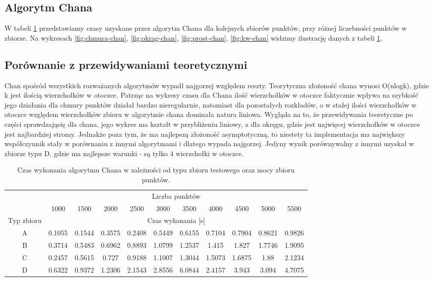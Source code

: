 \documentclass[11pt]{article}
\theoremstyle{remark} \newtheorem{definition}{def.}
\theoremstyle{definition} \newtheorem{twierdzenie}{tw.}
\begin{document}
\subsection{Algorytm Chana}

W tabeli \ref{tab:chan} przedstawiamy czasy uzyskane przez algorytm Chana dla kolejnych zbiorów punktów, przy różnej liczebności punktów w zbiorze. Na wykresach \ref{fig:chmura-chan}, 
\ref{fig:okrag-chan}, \ref{fig:prost-chan}, \ref{fig:kw-chan} widzimy ilustrację danych z tabeli \ref{tab:chan}.

\subsection{Porównanie z przewidywaniami teoretycznymi}
Chan spośród wszystkich rozważanych algorytmów wypadł najgorzej względem reszty. Teorytyczna złożoność chana wynosi O(nlogk), gdzie k jest ilością wierzchołków w otoczce. Patrząc na wykresy czasu dla Chana
ilość wierzchołków w otoczce faktycznie wpływa na szybkość jego działania dla chmury punktów działał bardzo nieregularnie, natomiast
dla pozostałych rozkładów, o w stałej ilości wierzchołków w otoczce względem wierzchołków zbioru w algorytmie chana dominała natura liniowa.
Wygląda na to, że przewidywania teoretyczne po części sprawdzająsię dla chana, jego wykres ma kształt w przybliżeniu liniowy, a dla okręgu, gdzie jest najwięcej
wierzchołków w otoczce jest najbardziej stromy. Jednakże poza tym, że ma najlepszą złożoność asymptotyczną, to niestety ta implementacja ma największy współczynnik stały w porównaniu z innymi algorytmami 
i dlatego wypada najgorzej. Jedyny wynik porównywalny z innymi uzyskał w zbiorze typu D, gdzie ma najlepsze warunki - są tylko 4 wierzchołki w otoczce.

\begin{table}[]
\centering
\caption{Czas wykonania algorytmu Chana w zależności od typu zbioru testowego oraz mocy zbioru punktów.}
\label{tab:chan}
\begin{tabular}{c|c|c|c|c|c|c|c|c|c|c|}
\cline{2-11}
\multicolumn{1}{l|}{} & \multicolumn{10}{c|}{Liczba punktów} \\ \cline{2-11} 
\multicolumn{1}{l|}{} & 1000 & 1500 & 2000 & 2500 & 3000 & 3500 & 4000 & 4500 & 5000 & 5500 \\ \hline
\multicolumn{1}{|c|}{Typ zbioru} & \multicolumn{10}{c|}{Czas wykonania {[}s{]}} \\ \hline
\multicolumn{1}{|c|}{A} & 0.1055 & 0.1544 & 0.3575 & 0.2408 & 0.5449 & 0.6155 & 0.7104 & 0.7904 & 0.8621 & 0.9826 \\ \hline
\multicolumn{1}{|c|}{B} & 0.3714 & 0.5483 & 0.6962 & 0.8893 & 1.0799 & 1.2537 & 1.415 & 1.827 & 1.7746 & 1.9095 \\ \hline
\multicolumn{1}{|c|}{C} & 0.2457 & 0.5615 & 0.727 & 0.9188 & 1.1007 & 1.3044 & 1.5073 & 1.6875 & 1.88 & 2.1234 \\ \hline
\multicolumn{1}{|c|}{D} & 0.6322 & 0.9372 & 1.2306 & 2.1543 & 2.8556 & 6.0844 & 2.4157 & 3.943 & 3.094 & 4.7075 \\ \hline
\end{tabular}
\end{table}
\end{document}
